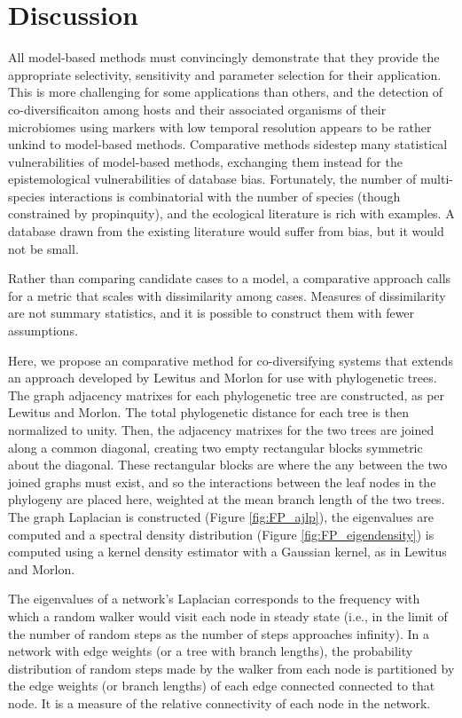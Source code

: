 \section{Discussion}

All model-based methods must convincingly demonstrate that they provide the appropriate selectivity, sensitivity and parameter selection for their application. This is more challenging for some applications than others, and the detection of co-diversificaiton among hosts and their associated organisms of their microbiomes using markers with low temporal resolution appears to be rather unkind to model-based methods. Comparative methods sidestep many statistical vulnerabilities of model-based methods, exchanging them instead for the epistemological vulnerabilities of database bias. Fortunately, the number of multi-species interactions is combinatorial with the number of species (though constrained by propinquity), and the ecological literature is rich with examples. A database drawn from the existing literature would suffer from bias, but it would not be small.

Rather than comparing candidate cases to a model, a comparative approach calls for a metric that scales with dissimilarity among cases. Measures of dissimilarity are not summary statistics, and it is possible to construct them with fewer assumptions. 



Here, we propose an comparative method for co-diversifying systems that extends an approach developed by Lewitus and Morlon \cite{lewitus2015characterizing} for use with phylogenetic trees. The graph adjacency matrixes for each phylogenetic tree are constructed, as per Lewitus and Morlon. The total phylogenetic distance for each tree is then normalized to unity. Then, the adjacency matrixes for the two trees are joined along a common diagonal, creating two empty rectangular blocks symmetric about the diagonal. These rectangular blocks are where the any between the two joined graphs must exist, and so the interactions between the leaf nodes in the phylogeny are placed here, weighted at the mean branch length of the two trees. The graph Laplacian is constructed (Figure \ref{fig:FP_ajlp}), the eigenvalues are computed and a spectral density distribution (Figure \ref{fig:FP_eigendensity}) is computed using a kernel density estimator with a Gaussian kernel, as in Lewitus and Morlon. 



The eigenvalues of a network's Laplacian corresponds to the frequency with which a random walker would visit each node in steady state (i.e., in the limit of the number of random steps as the number of steps approaches infinity). In a network with edge weights (or a tree with branch lengths), the probability distribution of random steps made by the walker from each node is partitioned by the edge weights (or branch lengths) of each edge connected connected to that node. It is a measure of the relative connectivity of each node in the network. 

